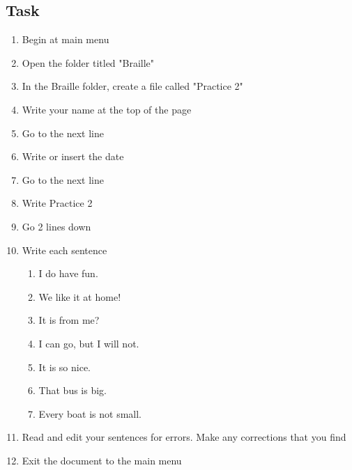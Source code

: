 \documentclass[10pt,letterpaper,twoside]{report}
\begin{document}
{\subsection{Task}
\begin{enumerate}
	\item Begin at main menu
	\item Open the folder titled "Braille"
	\item In the Braille folder, create a file called "Practice 2"
	\item Write your name at the top of the page
	\item Go to the next line
	\item Write or insert the date
	\item Go to the next line
	\item Write Practice 2
	\item Go 2 lines down
	\item Write each sentence
	      \begin{enumerate}
		      \item I do have fun.
		      \item We like it at home!
		      \item It is from me?
		      \item I can go, but I will not.
		      \item It is so nice.
		      \item That bus is big.
		      \item Every boat is not small.
	      \end{enumerate}
	\item Read and edit your sentences for errors. Make any corrections that you find
	\item Exit the document to the main menu
\end{enumerate}

\clearpage
}
\end{document}
